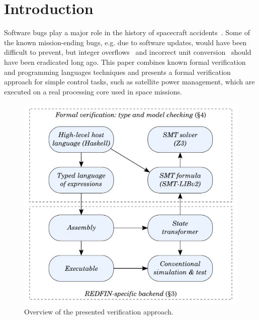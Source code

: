 \section{Introduction}\label{sec-intro}

Software bugs play a major role in the history of spacecraft
accidents~\cite{Leveson2004}. Some of the known mission-ending bugs, e.g. due to
software updates, would have been difficult to prevent, but integer
overflows~\cite{bug-rocket} and incorrect unit conversion~\cite{NASA:1999:Mars}
should have been eradicated long ago.
This paper combines known formal verification and programming languages
techniques and presents a formal verification approach for simple control tasks,
such as satellite power management, which are executed on a real processing core
used in space missions.



\begin{figure}
\centerline{\includegraphics[scale=0.42]{fig/overview.pdf}}
\caption{Overview of the presented verification approach.\label{fig-overview}}
\end{figure}


